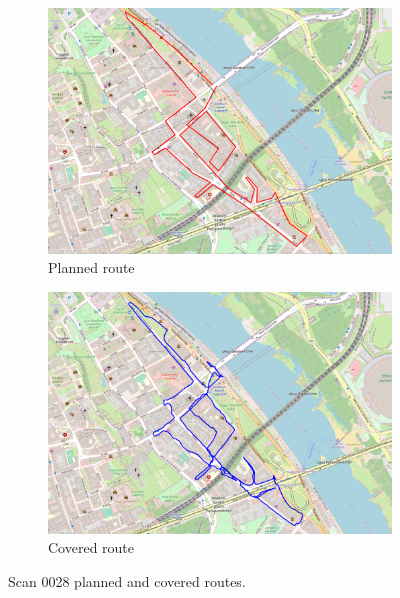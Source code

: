 \documentclass[a4paper,12pt]{book}
\begin{document}
\begin{enumerate}
\begin{figure}[H]
		\centering
		\begin{subfigure}{.95\textwidth}
			\centering
			\includegraphics[width=1\linewidth]{route_p28}
			\caption{Planned route}
			\label{fig:a28}
		\end{subfigure}%
		\linebreak
		\begin{subfigure}{.95\textwidth}
			\centering
			\includegraphics[width=1\linewidth]{route_c28}
			\caption{Covered route}
			\label{fig:b28}
		\end{subfigure}
		\caption{Scan 0028 planned and covered routes.}
		\label{fig:fig28}
	\end{figure}
\end{enumerate}
\end{document}
